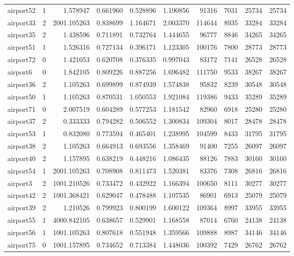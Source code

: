 \documentclass[../../../thesis.tex]{subfiles}
\begin{document}
\begin{longtable}{|l|r|r|r|r|r|r|r|r|r|}
airport52 & 1 & 1.578947 & 0.661960 & 0.528896 & 1.190856 & 91316 & 7031 & 25734 & 25734 \\
airport33 & 2 & 2001.105263 & 0.838699 & 1.164671 & 2.003370 & 114644 & 8935 & 33284 & 33284 \\
airport35 & 2 & 1.438596 & 0.711891 & 0.732764 & 1.444655 & 96777 & 8846 & 34265 & 34265 \\
airport51 & 1 & 1.526316 & 0.727134 & 0.396171 & 1.123305 & 100176 & 7800 & 28773 & 28773 \\
airport72 & 0 & 1.421053 & 0.620708 & 0.376335 & 0.997043 & 83172 & 7141 & 26528 & 26528 \\
airport6 & 0 & 1.842105 & 0.809226 & 0.887256 & 1.696482 & 111750 & 9533 & 38267 & 38267 \\
airport36 & 2 & 1.105263 & 0.699899 & 0.874939 & 1.574838 & 95832 & 8239 & 30548 & 30548 \\
airport50 & 1 & 1.105263 & 0.870531 & 1.050553 & 1.921084 & 119386 & 9433 & 35289 & 35289 \\
airport71 & 0 & 2.007519 & 0.604289 & 0.577253 & 1.181542 & 82960 & 6918 & 25280 & 25280 \\
airport37 & 2 & 0.333333 & 0.794282 & 0.506552 & 1.300834 & 109304 & 8017 & 28478 & 28478 \\
airport53 & 1 & 0.832080 & 0.773594 & 0.465401 & 1.238995 & 104599 & 8433 & 31795 & 31795 \\
airport38 & 2 & 1.105263 & 0.664913 & 0.693556 & 1.358469 & 91400 & 7255 & 26097 & 26097 \\
airport40 & 2 & 1.157895 & 0.638219 & 0.448216 & 1.086435 & 88126 & 7883 & 30160 & 30160 \\
airport54 & 1 & 2001.105263 & 0.708908 & 0.811473 & 1.520381 & 83376 & 7308 & 26816 & 26816 \\
airport3 & 2 & 1001.210526 & 0.733472 & 0.432922 & 1.166394 & 100650 & 8111 & 30277 & 30277 \\
airport42 & 2 & 1001.368421 & 0.629047 & 0.478488 & 1.107535 & 86901 & 6913 & 25079 & 25079 \\
airport39 & 2 & 1.210526 & 0.799923 & 0.800199 & 1.600122 & 109364 & 8997 & 33955 & 33955 \\
airport55 & 1 & 4000.842105 & 0.638657 & 0.529901 & 1.168558 & 87014 & 6760 & 24138 & 24138 \\
airport56 & 1 & 1001.105263 & 0.807618 & 0.551948 & 1.359566 & 109888 & 8987 & 34146 & 34146 \\
airport75 & 0 & 1001.157895 & 0.734652 & 0.713384 & 1.448036 & 100392 & 7429 & 26762 & 26762 \\

\end{longtable}
\end{document}
